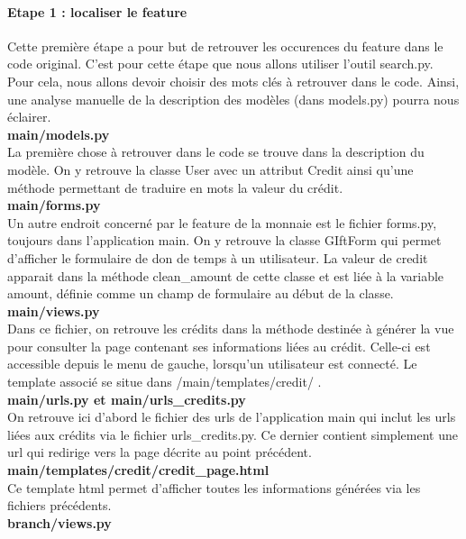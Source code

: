 \paragraph{Etape 1 : localiser le feature}

Cette première étape a pour but de retrouver les occurences du feature dans le code original.  C'est pour cette étape que nous allons utiliser l'outil search.py.  Pour cela,  nous allons devoir choisir des mots clés à retrouver dans le code.  Ainsi,  une analyse manuelle de la description des modèles (dans models.py) pourra nous éclairer.
\\
\textbf{main/models.py}
\\%
La première chose à retrouver dans le code se trouve dans la description du modèle.  On y retrouve la classe User avec un attribut Credit ainsi qu'une méthode permettant de traduire en mots la valeur du crédit.
\\
\textbf{main/forms.py}
\\%
Un autre endroit concerné par le feature de la monnaie est le fichier forms.py,  toujours dans l'application main.  On y retrouve la classe GIftForm qui permet d'afficher le formulaire de don de temps à un utilisateur.  La valeur de credit apparait dans la méthode clean\_amount de cette classe et est liée à la variable amount,  définie comme un champ de formulaire au début de la classe.
\\
\textbf{main/views.py}
\\%
Dans ce fichier,  on retrouve les crédits dans la méthode destinée à générer la vue pour consulter la page contenant ses informations liées au crédit.  Celle-ci est accessible depuis le menu de gauche,  lorsqu'un utilisateur est connecté.  Le template associé se situe dans /main/templates/credit/ .
\\
\textbf{main/urls.py et main/urls\_credits.py}
\\%
On retrouve ici d'abord le fichier des urls de l'application main qui inclut les urls liées aux crédits via le fichier urls\_credits.py.  Ce dernier contient simplement une url qui redirige vers la page décrite au point précédent.
\\
\textbf{main/templates/credit/credit\_page.html}
\\%
Ce template html permet d'afficher toutes les informations générées via les fichiers précédents.
\\
\textbf{branch/views.py}
